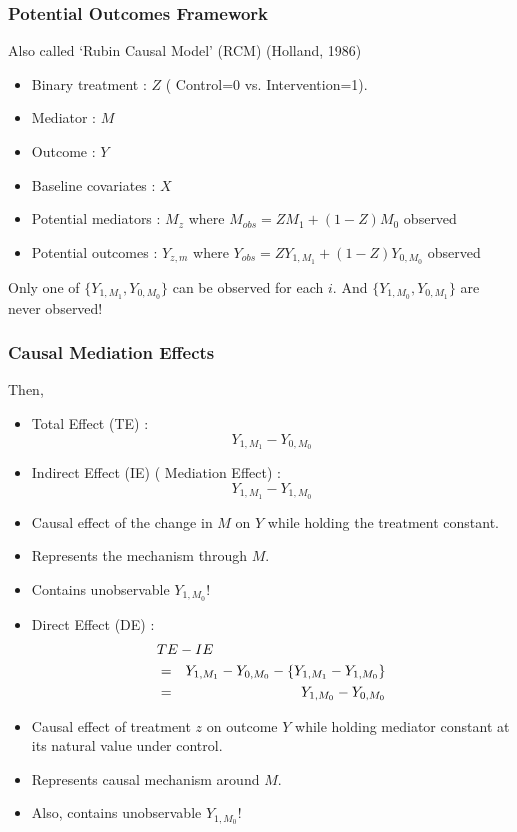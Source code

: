 \documentclass{beamer}
\begin{document}
\begin{frame}
\frametitle{Potential Outcomes Framework}
Also called `Rubin Causal Model' (RCM) (Holland, 1986)
\begin{itemize}
\item Binary treatment :   $Z$ ( Control=0 vs. Intervention=1).
\item Mediator : $M$
\item Outcome : $Y$
\item Baseline covariates : $X$
\item Potential mediators : $M_z$ where $M_{obs}=Z M_1 + (1-Z) M_0$ observed
\item {\color{red} Potential outcomes
} : $Y_{z,m}$ where $Y_{obs}=Z Y_{1,M_{1}} + (1-Z) Y_{0,M_0}$
  observed
\end{itemize}
Only one of $\{Y_{1,M_1},Y_{0,M_0}\}$ can be observed for each
$i$. And $\{Y_{1,M_0},Y_{0,M_1}\}$ are never observed!
\end{frame}

\begin{frame}
\frametitle{Causal Mediation Effects}
Then,
\begin{itemize}
\item Total Effect (TE) : \[Y_{1,M_1}-Y_{0,M_0}\]
\item Indirect Effect (IE) ({\color{red} Mediation Effect}) :
  \[Y_{1,M_1} - Y_{1,M_0}\]
\item Causal effect of the change in $M$ on $Y$ while holding the
  treatment constant.
\item Represents the mechanism through $M$.
\item Contains unobservable {\color{red} $Y_{1,M_0}$}! 
\end{itemize}
\end{frame}

\begin{frame}
\begin{itemize}
\item Direct Effect (DE) :
\begin{eqnarray*}
\lefteqn{TE - IE }\\
& = & Y_{1,M_1}-Y_{0,M_0}
-\{Y_{1,M_1}-Y_{1,M_0}\}\\
 & = & Y_{1,M_0}-Y_{0,M_0}
\end{eqnarray*}
\item Causal effect of treatment $z$ on outcome $Y$ while holding
  mediator constant at its natural value under control.
\medskip
\item Represents causal mechanism around $M$.
\medskip
\item Also, contains unobservable  {\color{red} $Y_{1,M_0}$}! 
\end{itemize}
\end{frame}
\end{document}

